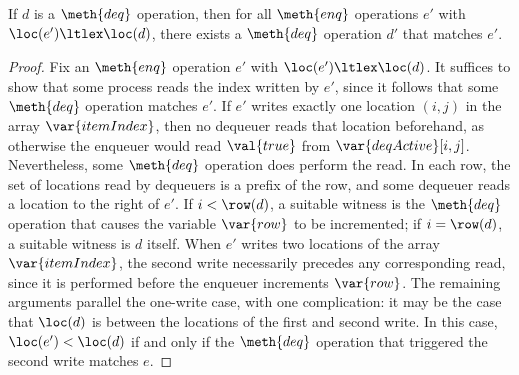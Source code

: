 \begin{lemma}
\label{lemma:complete}
If $d$ is a $\meth{deq}$ operation, 
then for all $\meth{enq}$ operations $e'$ 
with $\loc(e') \ltlex \loc(d)$, 
there exists a $\meth{deq}$ operation $d'$ 
that matches $e'$. 
\end{lemma}
\begin{proof}
Fix an $\meth{enq}$ operation $e'$ with $\loc(e') \ltlex \loc(d)$. 
It suffices to show that some process reads the index written by $e'$, 
since it follows that some $\meth{deq}$ operation matches $e'$. 
If $e'$ writes exactly one location $(i, j)$ 
in the array $\var{itemIndex}$, 
then no dequeuer reads that location beforehand, 
as otherwise the enqueuer would read $\val{true}$ 
from $\var{deqActive}[i, j]$. 
Nevertheless, some $\meth{deq}$ operation does perform the read. 
In each row, 
the set of locations read by dequeuers is a prefix of the row, 
and some dequeuer reads a location to the right of $e'$. 
If $i < \row(d)$, 
a suitable witness is the $\meth{deq}$ operation 
that causes the variable $\var{row}$ to be incremented; 
if $i = \row(d)$, a suitable witness is $d$ itself. 
When $e'$ writes two locations of the array $\var{itemIndex}$, 
the second write necessarily precedes any corresponding read, 
since it is performed before the enqueuer increments $\var{row}$. 
The remaining arguments parallel the one-write case, 
with one complication: 
it may be the case that $\loc(d)$ is between 
the locations of the first and second write. 
In this case, $\loc(e') < \loc(d)$ if and only if 
the $\meth{deq}$ operation that triggered the second write matches $e$. 
\end{proof}

